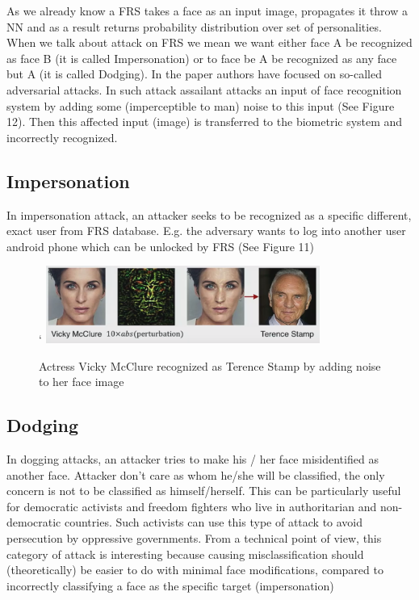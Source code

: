 As we already know a FRS takes a face as an input image, propagates it throw a NN and as a result returns probability distribution over set of personalities. When we talk about attack on FRS we mean we want either face A be recognized as face B (it is called Impersonation) or to face be A be recognized as any face but A (it is called Dodging). In the paper authors have focused on so-called adversarial attacks. In such attack assailant attacks an input of face recognition system by adding some (imperceptible to man) noise to this input (See Figure 12). Then this affected input (image) is transferred to the biometric system and incorrectly recognized.
 

\subsection{Impersonation}

In impersonation attack, an attacker seeks to be recognized as a specific different, exact user from FRS database. E.g. the adversary wants to log into another user android phone which can be unlocked by FRS (See Figure 11)
\begin{figure}[ht]
\centering`
\includegraphics[width=0.8\textwidth]{Images/impersonification.png}
\caption[]{Actress Vicky McClure recognized as Terence Stamp by adding noise to her face image\footnotemark}
\end{figure}


\subsection{Dodging}

In dogging attacks, an attacker tries to make his / her face misidentified as another face. Attacker don't care as whom  he/she will be classified, the only concern is not to be classified as himself/herself. This can be particularly useful for democratic activists and freedom fighters who live in authoritarian and non-democratic countries. Such activists can use this type of attack to avoid persecution by oppressive governments. From a technical point of view, this category of attack is interesting because causing misclassification should (theoretically) be easier to do with minimal face modifications, compared to incorrectly classifying a face as the specific target (impersonation)